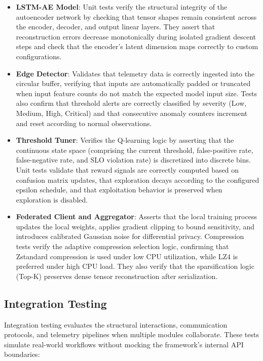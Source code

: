 \begin{itemize}
    \item \textbf{LSTM-AE Model}: Unit tests verify the structural integrity of the autoencoder network by checking that tensor shapes remain consistent across the encoder, decoder, and output linear layers. They assert that reconstruction errors decrease monotonically during isolated gradient descent steps and check that the encoder's latent dimension maps correctly to custom configurations.
    \item \textbf{Edge Detector}: Validates that telemetry data is correctly ingested into the circular buffer, verifying that inputs are automatically padded or truncated when input feature counts do not match the expected model input size. Tests also confirm that threshold alerts are correctly classified by severity (Low, Medium, High, Critical) and that consecutive anomaly counters increment and reset according to normal observations.
    \item \textbf{Threshold Tuner}: Verifies the Q-learning logic by asserting that the continuous state space (comprising the current threshold, false-positive rate, false-negative rate, and SLO violation rate) is discretized into discrete bins. Unit tests validate that reward signals are correctly computed based on confusion matrix updates, that exploration decays according to the configured epsilon schedule, and that exploitation behavior is preserved when exploration is disabled.
    \item \textbf{Federated Client and Aggregator}: Asserts that the local training process updates the local weights, applies gradient clipping to bound sensitivity, and introduces calibrated Gaussian noise for differential privacy. Compression tests verify the adaptive compression selection logic, confirming that Zstandard compression is used under low CPU utilization, while LZ4 is preferred under high CPU load. They also verify that the sparsification logic (Top-K) preserves dense tensor reconstruction after serialization.
\end{itemize}

\subsection{Integration Testing}
\label{subsec:integration_testing}

Integration testing evaluates the structural interactions, communication protocols, and telemetry pipelines when multiple modules collaborate. These tests simulate real-world workflows without mocking the framework's internal API boundaries:

